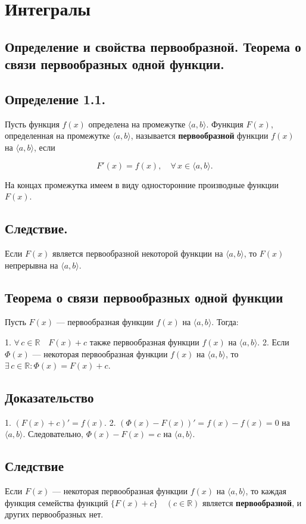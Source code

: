{
\section{Интегралы}
\subsection{Определение и свойства первообразной. Теорема о связи первообразных одной функции.}
\subsection*{Определение 1.1.}

Пусть функция \( f(x) \) определена на промежутке \( \langle a, b \rangle \). Функция \( F(x) \), определенная на промежутке \( \langle a, b \rangle \), называется \textbf{первообразной} функции \( f(x) \) на \( \langle a, b \rangle \), если 

\[
F'(x) = f(x), \quad \forall \, x \in \langle a, b \rangle.
\]


На концах промежутка имеем в виду односторонние производные функции \( F(x) \).


\subsection*{Следствие.}

Если \( F(x) \) является первообразной некоторой функции на \( \langle a, b \rangle \), то \( F(x) \) непрерывна на \( \langle a, b \rangle \).

\subsection*{Теорема о
связи первообразных одной функции}

Пусть \( F(x) \) — первообразная функции \( f(x) \) на \( \langle a, b \rangle \). Тогда:

1. \( \forall \, c \in \mathbb{R} \quad F(x) + c \) также первообразная функции \( f(x) \) на \( \langle a, b \rangle \).
2. Если \( \Phi(x) \) — некоторая первообразная функции \( f(x) \) на \( \langle a, b \rangle \), то \( \exists \, c \in \mathbb{R} \colon \Phi(x) = F(x) + c \).

\subsection*{Доказательство}

1. \( (F(x) + c)' = f(x) \).
2. \( (\Phi(x) - F(x))' = f(x) - f(x) = 0 \) на \( \langle a, b \rangle \). Следовательно, \( \Phi(x) - F(x) = c \) на \( \langle a, b \rangle \).

\subsection*{Следствие}

Если \( F(x) \) — некоторая первообразная функции \( f(x) \) на \( \langle a, b \rangle \), то каждая функция семейства функций \( \{ F(x) + c \} \quad (c \in \mathbb{R}) \) является \textbf{первообразной}, и других первообразных нет.

}